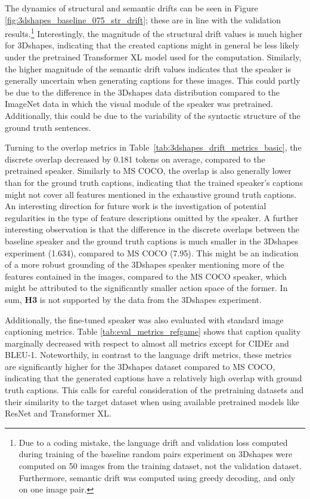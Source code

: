 The dynamics of structural and semantic drifts can be seen in Figure \ref{fig:3dshapes_baseline_075_str_drift}; these are in line with the validation results.\footnote{Due to a coding mistake, the language drift and validation loss computed during training of the baseline random pairs experiment on 3Dshapes were computed on 50 images from the training dataset, not the validation dataset. Furthermore, semantic drift was computed using greedy decoding, and only on one image pair.} 
Interestingly, the magnitude of the structural drift values is much higher for 3Dshapes, indicating that the created captions might in general be less likely under the pretrained Transformer XL model used for the computation. Similarly, the higher magnitude of the semantic drift values indicates that the speaker is generally uncertain when generating captions for these images. This could partly be due to the difference in the 3Dshapes data distribution compared to the ImageNet data in which the visual module of the speaker was pretrained. Additionally, this could be due to the variability of the syntactic structure of the ground truth sentences. 

Turning to the overlap metrics in Table~\ref{tab:3dshapes_drift_metrics_basic}, the discrete overlap decreased by 0.181 tokens on average, compared to the pretrained speaker. Similarly to MS COCO, the overlap is also generally lower than for the ground truth captions, indicating that the trained speaker's captions might not cover all features mentioned in the exhaustive ground truth captions. An interesting direction for future work is the investigation of potential regularities in the type of feature descriptions omitted by the speaker. A further interesting observation is that the difference in the discrete overlaps between the baseline speaker and the ground truth captions is much smaller in the 3Dshapes experiment (1.634), compared to MS COCO (7.95). This might be an indication of a more robust grounding of the 3Dshapes speaker mentioning more of the features contained in the images, compared to the MS COCO speaker, which might be attributed to the significantly smaller action space of the former. In sum, \textbf{H3} is not supported by the data from the 3Dshapes experiment.


Additionally, the fine-tuned speaker was also evaluated with standard image captioning metrics. Table \ref{tab:eval_metrics_refgame} shows that caption quality marginally decreased with respect to almost all metrics except for CIDEr and BLEU-1. Noteworthily, in contrast to the language drift metrics, these metrics are significantly higher for the 3Dshapes dataset compared to MS COCO, indicating that the generated captions have a relatively high overlap with ground truth captions. This calls for careful consideration of the pretraining datasets and their similarity to the target dataset when using available pretrained models like ResNet and Transformer XL.

